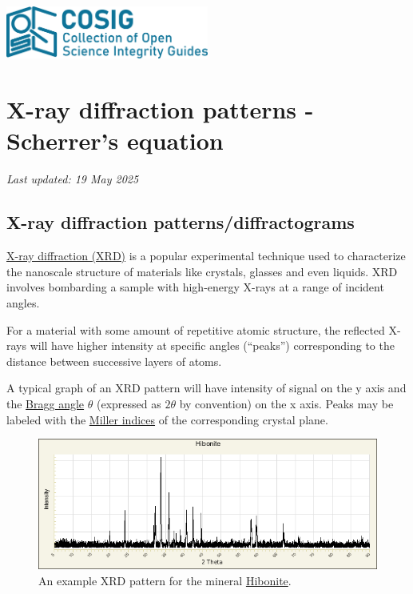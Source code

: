 \documentclass[letterpaper, 12pt]{article}
\begin{document}
\flushleft
\includegraphics[width=0.5\textwidth]{img/home/241017_final_logo_mockup.png}

\section*{X-ray diffraction patterns - Scherrer's equation}
\textit{Last updated: 19 May 2025}

\subsection*{X-ray diffraction patterns/diffractograms}

\href{https://web.pdx.edu/~pmoeck/phy381/Topic5a-XRD.pdf}{X-ray diffraction (XRD)} is a popular experimental technique used to characterize the nanoscale structure of materials like crystals, glasses and even liquids. XRD involves bombarding a sample with high-energy X-rays at a range of incident angles.

For a material with some amount of repetitive atomic structure, the reflected X-rays will have higher intensity at specific angles (``peaks'') corresponding to the distance between successive layers of atoms.

A typical graph of an XRD pattern will have intensity of signal on the y axis and the \href{https://en.wikipedia.org/wiki/Bragg%27s_law}{Bragg angle} $\theta$
(expressed as $2\theta$ by convention) on the x axis. Peaks may be labeled with the \href{https://chem.libretexts.org/Courses/Lafayette_College/CHEM_212_213%3A_Inorganic_Chemistry_(Nataro)/03%3A_Solid_state/3.10%3A_Miller_Indices_(hkl)}{Miller indices} of the corresponding crystal plane.

\begin{figure}[h!tbp]
    \includegraphics[width=\textwidth]{img/xrd/powder__2857__1486.png}
    \caption*{An example XRD pattern for the mineral \href{https://rruff.info/R061069}{Hibonite}.}
\end{figure}
\end{document}
